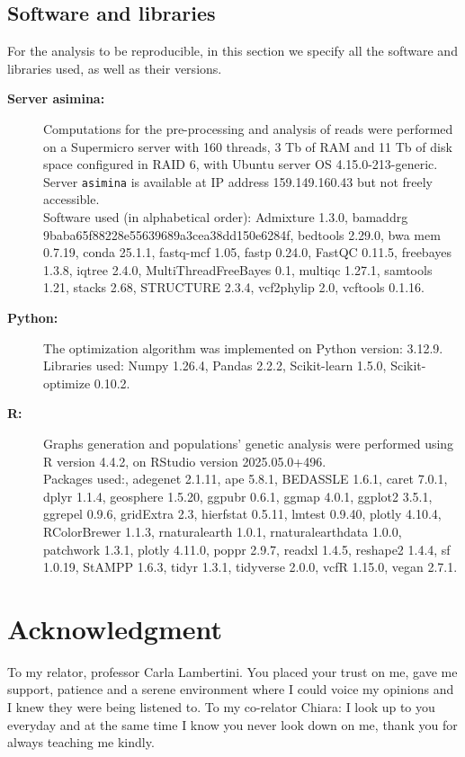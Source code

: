 \documentclass[a4paper, 12pt]{report}
\begin{document}
\section{Software and libraries}
For the analysis to be reproducible, in this section we specify all the software and libraries used, as well as their versions. 
\vspace{-1.5em}
\begin{description}
	\item[\textbf{Server asimina:}] Computations for the pre-processing and analysis of reads were performed on a Supermicro server with 160 threads, 3 Tb of RAM and 11 Tb of disk space configured in RAID 6, with Ubuntu server OS 4.15.0-213-generic. Server \texttt{asimina} is available at IP address 159.149.160.43 but not freely accessible. \\ Software used (in alphabetical order): Admixture 1.3.0, bamaddrg 9baba65f88228e55639689a3cea38dd150e6284f, bedtools 2.29.0, bwa mem 0.7.19, conda 25.1.1, fastq-mcf 1.05, fastp 0.24.0, FastQC 0.11.5, freebayes 1.3.8, iqtree 2.4.0, MultiThreadFreeBayes 0.1, multiqc 1.27.1, samtools 1.21, stacks 2.68, STRUCTURE 2.3.4, vcf2phylip 2.0, vcftools 0.1.16.
	\item[\textbf{Python:}] The optimization algorithm was implemented on Python version: 3.12.9. \\ Libraries used: Numpy 1.26.4, Pandas 2.2.2, Scikit-learn 1.5.0, Scikit-optimize 0.10.2.
	\item[\textbf{R:}] Graphs generation and populations' genetic analysis were performed using R version 4.4.2, on RStudio version 2025.05.0+496. \\ Packages used:, adegenet 2.1.11, ape 5.8.1, BEDASSLE 1.6.1, caret 7.0.1, dplyr 1.1.4, geosphere 1.5.20, ggpubr 0.6.1, ggmap 4.0.1, ggplot2 3.5.1, ggrepel 0.9.6, gridExtra 2.3, hierfstat 0.5.11, lmtest 0.9.40, plotly 4.10.4, RColorBrewer 1.1.3, rnaturalearth 1.0.1, rnaturalearthdata 1.0.0, patchwork 1.3.1, plotly 4.11.0, poppr 2.9.7, readxl 1.4.5, reshape2 1.4.4, sf 1.0.19, StAMPP 1.6.3, tidyr 1.3.1, tidyverse 2.0.0, vcfR 1.15.0, vegan 2.7.1.
\end{description}

\clearpage
\chapter{Acknowledgment}
\noindent  To my relator, professor Carla Lambertini. You placed your trust on me, gave me support, patience and a serene environment where I could voice my opinions and I knew they were being listened to. To my co-relator Chiara: I look up to you everyday and at the same time I know you never look down on me, thank you for always teaching me kindly.
\end{document}
